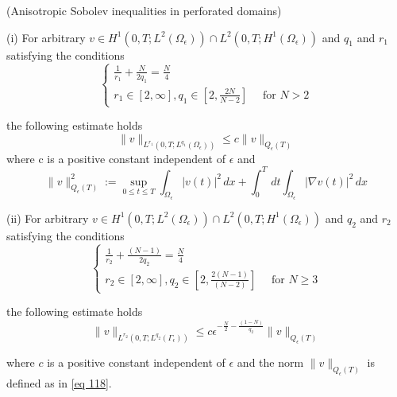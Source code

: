 \begin{lemma} (Anisotropic Sobolev inequalities in perforated domains)

(i) For arbitrary $v \in H^{1}\left(0, T ; L^{2}\left(\Omega_{\epsilon}\right)\right) \cap L^{2}\left(0, T ; H^{1}\left(\Omega_{\epsilon}\right)\right)$ and $q_{1}$ and $r_{1}$ satisfying the conditions
\begin{equation}
  \left\{\begin{array}{l}
\frac{1}{r_{1}}+\frac{N}{2 q_{1}}=\frac{N}{4} \\
r_{1} \in[2, \infty], q_{1} \in\left[2, \frac{2 N}{N-2}\right] \quad \text { for } N>2
\end{array}\right.
\label{eq 116}\end{equation}

the following estimate holds
\begin{equation}
  \|v\|_{L^{r_{1}}\left(0, T ; L^{q_{1}}\left(\Omega_{\epsilon}\right)\right)} \leq c\|v\|_{Q_{\epsilon}(T)}
\label{eq 117}\end{equation}
where $\mathrm{c}$ is a positive constant independent of $\epsilon$ and
\begin{equation}
  \|v\|_{Q_{\epsilon}(T)}^{2}:=\sup _{0 \leq t \leq T} \int_{\Omega_{\epsilon}}|v(t)|^{2} \, d  x+\int_{0}^{T} \, d  t \int_{\Omega_{\epsilon}}|\nabla v(t)|^{2} \, d  x
\label{eq 118}\end{equation}


(ii) For arbitrary $v \in H^{1}\left(0, T ; L^{2}\left(\Omega_{\epsilon}\right)\right) \cap L^{2}\left(0, T ; H^{1}\left(\Omega_{\epsilon}\right)\right)$ and $q_{2}$ and $r_{2}$ satisfying the conditions
\begin{equation}
  \left\{\begin{array}{l}
\frac{1}{r_{2}}+\frac{(N-1)}{2 q_{2}}=\frac{N}{4} \\
r_{2} \in[2, \infty], q_{2} \in\left[2, \frac{2(N-1)}{(N-2)}\right] \quad \text { for } N \geq 3
\end{array}\right.
\label{eq 119}\end{equation}


the following estimate holds
\begin{equation}
  \|v\|_{L^{r_{2}}\left(0, T ; L^{q_{2}}\left(\Gamma_{\epsilon}\right)\right)} \leq c \epsilon^{-\frac{N}{2}-\frac{(1-N)}{q_{2}}}\|v\|_{Q_{\epsilon}(T)}
\label{eq 120}\end{equation}


where $c$ is a positive constant independent of $\epsilon$ and the norm $\|v\|_{Q_{\epsilon}(T)}$ is defined as in \eqref{eq 118}.
\label{lemma 7.3}\end{lemma}
